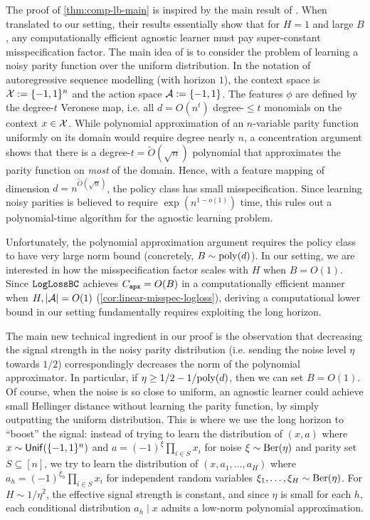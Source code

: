 The proof of \cref{thm:comp-lb-main} is inspired by the main result of \cite{diakonikolas2022hardness}. When translated to our setting, their results essentially show that for $H=1$ and large $B$, any computationally efficient agnostic learner must pay super-constant misspecification factor. The main idea of \cite{diakonikolas2022hardness} is to consider the problem of learning a noisy parity function over the uniform distribution. In the notation of autoregressive sequence modelling (with horizon $1$), the context space is $\mathcal{X} := \{-1,1\}^n$ and the action space $\mathcal{A} := \{-1,1\}$. The features $\phi$ are defined by the degree-$t$ Veronese map, i.e. all $d = O(n^t)$ degree-$\leq t$ monomials on the context $x \in \mathcal{X}$. While polynomial approximation of an $n$-variable parity function uniformly on its domain would require degree nearly $n$, a concentration argument shows that there is a degree-$t=\tilde{O}(\sqrt{n})$ polynomial that approximates the parity function on \emph{most} of the domain. Hence, with a feature mapping of dimension $d=n^{\tilde{O}(\sqrt{n})}$, the policy class has small misspecification. Since learning noisy parities is believed to require $\exp(n^{1-o(1)})$ time, this rules out a polynomial-time algorithm for the agnostic learning problem.

Unfortunately, the polynomial approximation argument requires the policy class to have very large norm bound (concretely, $B \sim \mathrm{poly}(d)$). In our setting, we are interested in how the misspecification factor scales with $H$ when $B = O(1)$. Since $\texttt{LogLossBC}$ achieves $C_{\texttt{apx}} = O(B)$ in a computationally efficient manner when $H, |\mathcal{A}| = O(1)$ (\cref{cor:linear-misspec-logloss}), deriving a computational lower bound in our setting fundamentally requires exploiting the long horizon.

The main new technical ingredient in our proof is the observation that decreasing the signal strength in the noisy parity distribution (i.e. sending the noise level $\eta$ towards $1/2$) correspondingly decreases the norm of the polynomial approximator. In particular, if $\eta \geq 1/2- 1/\mathrm{poly}(d)$, then we can set $B = O(1)$. Of course, when the noise is so close to uniform, an agnostic learner could achieve small Hellinger distance without learning the parity function, by simply outputting the uniform distribution. This is where we use the long horizon to ``boost'' the signal: instead of trying to learn the distribution of $(x, a)$ where $x \sim \mathsf{Unif}(\{-1,1\}^n)$ and $a = (-1)^\xi \prod_{i \in S} x_i$ for noise $\xi \sim \mathrm{Ber}(\eta)$ and parity set $S \subseteq [n]$, we try to learn the distribution of $(x,a_1,\dots,a_H)$ where $a_h = (-1)^{\xi_h} \prod_{i \in S} x_i$ for independent random variables $\xi_1,\dots,\xi_H \sim \mathrm{Ber}(\eta)$. For $H \sim 1/\eta^2$, the effective signal strength is constant, and since $\eta$ is small for each $h$, each conditional distribution $a_h\mid{}x$ admits a low-norm polynomial approximation.


